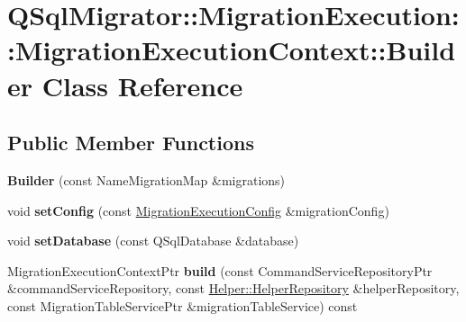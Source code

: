 \hypertarget{class_q_sql_migrator_1_1_migration_execution_1_1_migration_execution_context_1_1_builder}{}\section{Q\+Sql\+Migrator\+:\+:Migration\+Execution\+:\+:Migration\+Execution\+Context\+:\+:Builder Class Reference}
\label{class_q_sql_migrator_1_1_migration_execution_1_1_migration_execution_context_1_1_builder}
\subsection*{Public Member Functions}
\begin{DoxyCompactItemize}
\item 
\mbox{\label{class_q_sql_migrator_1_1_migration_execution_1_1_migration_execution_context_1_1_builder_a3d9c98a9de313a99cff64abf47563933}} 
{\bfseries Builder} (const Name\+Migration\+Map \&migrations)
\item 
\mbox{\label{class_q_sql_migrator_1_1_migration_execution_1_1_migration_execution_context_1_1_builder_ace2423710b55d240f4df28f6d60dd553}} 
void {\bfseries set\+Config} (const \hyperlink{struct_q_sql_migrator_1_1_migration_execution_1_1_migration_execution_config}{Migration\+Execution\+Config} \&migration\+Config)
\item 
\mbox{\label{class_q_sql_migrator_1_1_migration_execution_1_1_migration_execution_context_1_1_builder_a51ba03a0a9b7d7dc3b8936c9e7823cd3}} 
void {\bfseries set\+Database} (const Q\+Sql\+Database \&database)
\item 
\mbox{\label{class_q_sql_migrator_1_1_migration_execution_1_1_migration_execution_context_1_1_builder_a642e75548a8d71b1459e4964a36e0fe6}} 
Migration\+Execution\+Context\+Ptr {\bfseries build} (const Command\+Service\+Repository\+Ptr \&command\+Service\+Repository, const \hyperlink{class_q_sql_migrator_1_1_helper_1_1_helper_repository}{Helper\+::\+Helper\+Repository} \&helper\+Repository, const Migration\+Table\+Service\+Ptr \&migration\+Table\+Service) const
\end{DoxyCompactItemize}


